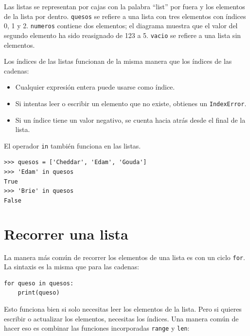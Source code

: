\documentclass[10pt]{book}
\begin{document}
Las listas se representan por cajas con la palabra ``list'' por fuera
y los elementos de la lista por dentro.  {\tt quesos} se refiere a
una lista con tres elementos con índices 0, 1 y 2.
{\tt numeros} contiene dos elementos; el diagrama muestra que el
valor del segundo elemento ha sido reasignado de 123 a 5.
{\tt vacio} se refiere a una lista sin elementos.

Los índices de las listas funcionan de la misma manera que los índices de las cadenas:

\begin{itemize}

\item Cualquier expresión entera puede usarse como índice.

\item Si intentas leer o escribir un elemento que no existe,
obtienes un {\tt IndexError}.

\item Si un índice tiene un valor negativo, se cuenta hacia atrás desde el
final de la lista.

\end{itemize}


El operador {\tt in} también funciona en las listas.

\begin{verbatim}
>>> quesos = ['Cheddar', 'Edam', 'Gouda']
>>> 'Edam' in quesos
True
>>> 'Brie' in quesos
False
\end{verbatim}


\section{Recorrer una lista}

La manera más común de recorrer los elementos de una lista es
con un ciclo {\tt for}.  La sintaxis es la misma que para las cadenas:

\begin{verbatim}
for queso in quesos:
    print(queso)
\end{verbatim}
%
Esto funciona bien si solo necesitas leer los elementos de la
lista.  Pero si quieres escribir o actualizar los elementos,
necesitas los índices.  Una manera común de hacer eso es combinar
las funciones incorporadas {\tt range} y {\tt len}:
\end{document}
